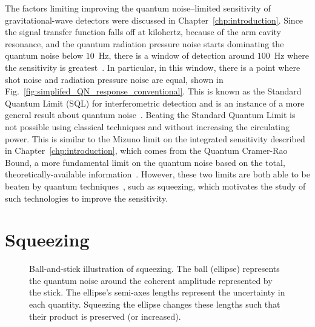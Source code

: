 The factors limiting improving the quantum noise--limited sensitivity of gravitational-wave detectors were discussed in Chapter~\ref{chp:introduction}. Since the signal transfer function falls off at kilohertz, because of the arm cavity resonance, and the quantum radiation pressure noise starts dominating the quantum noise below $10$~Hz, there is a window of detection around $100$~Hz where the sensitivity is greatest~\cite{}. In particular, in this window, there is a point where shot noise and radiation pressure noise are equal, shown in Fig.~\ref{fig:simplifed_QN_response_conventional}.  %
This is known as the Standard Quantum Limit (SQL) for interferometric detection and is an instance of a more general result about quantum noise~\cite{}. Beating the Standard Quantum Limit is not possible using classical techniques  and without increasing the circulating power. This is similar to the Mizuno limit on the integrated sensitivity described in Chapter~\ref{chp:introduction}, which comes from the Quantum Cramer-Rao Bound, a more fundamental limit on the quantum noise based on the total, theoretically-available information~\cite{MiaoQCRB2015}. However, these two limits are both able to be beaten  by quantum techniques~\cite{MiaoQCRB2015,}, such as squeezing, which motivates the study of such technologies to improve the sensitivity.



\section{Squeezing}
\label{sec:squeezing_background}

\begin{figure}
	\centering
	\caption{Ball-and-stick illustration of squeezing. The ball (ellipse) represents the quantum noise around the coherent amplitude represented by the stick. The ellipse's semi-axes lengths represent the uncertainty in each quantity. Squeezing the ellipse changes these lengths such that their product is preserved (or increased).}
	\label{fig:ballandstick_simple}
\end{figure}

